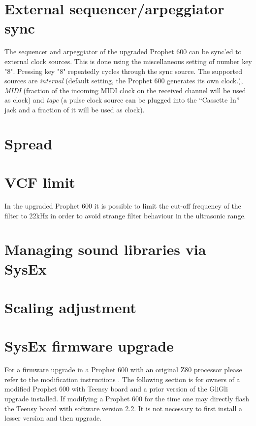 \documentclass[draft,landscape, 11pt, oneside]{report}
\newenvironment{flowtext}{\addmargin[0cm]{7cm}}{\endaddmargin} %
\begin{document}
\begin{flowtext}
\section{External sequencer/arpeggiator sync}\label{sync}

The sequencer and arpeggiator of the upgraded Prophet 600 can be sync'ed to external clock sources. This is done using the miscellaneous setting of number key "8". Pressing key "8" repeatedly cycles through the sync source. The supported sources are \textit{internal} (default setting, the Prophet 600 generates its own clock.), \textit{MIDI} (fraction of the incoming MIDI clock on the received channel will be used as clock) and \textit{tape} (a pulse clock source can be plugged into the “Cassette In” jack and a fraction of it will be used as clock).

\section{Spread}\label{spreadsett}



\section{VCF limit}\label{limitsett}

In the upgraded Prophet 600 it is possible to limit the cut-off frequency of the filter to 22kHz in order to avoid strange filter behaviour in the ultrasonic range.

\section{Managing sound libraries via SysEx}\label{mididump}



\section{Scaling adjustment}\label{maintenance}



\section{SysEx firmware upgrade}\label{fwupgrade}

For a firmware upgrade in a Prophet 600 with an original Z80 processor please refer to the modification instructions \cite{modinstructions}. The following section is for owners of a modified Prophet 600 with Teensy board and a prior version of the GliGli upgrade installed. If modifying a Prophet 600 for the time one may directly flash the Teensy board with software version 2.2. It is not necessary to first install a lesser version and then upgrade.


\end{flowtext}
\end{document}
